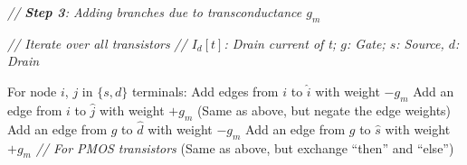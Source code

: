 \begin{algorithm*}[t]
\begin{multicols}{2}
\begin{algorithmic}[1]
    
\EndFor \label{algo1:step2_end}

\Statex\textit{// \textbf{Step 3}: Adding branches due to transconductance $g_m$}

 \textit{// Iterate over all transistors} \label{algo1:step3_begin}
    \Statex \textit{// $I_d[t]$: Drain current of t; $g$: Gate; $s$: Source, $d$: Drain}

            \State For node $i$, $j$  in $\{s,d\}$ terminals:
                \State Add edges from $i$ to $\hat{i}$ with weight $-g_m$ 
                \State Add an edge from $i$ to $\hat{j}$ with weight $+g_m$ 
            \Else  
                \State (Same as above, but negate the edge weights)
            \EndIf
            \State Add an edge from $g$ to $\hat{d}$ with weight $-g_m$ 
            \State Add an edge from $g$ to $\hat{s}$ with weight $+g_m$ 
        \Else \textit{// For PMOS transistors}
            \State (Same as above, but exchange ``then'' and ``else'')
        \EndIf
\EndIf
\EndFor \label{algo1:step3_end}



\end{algorithmic}
\end{multicols}
\end{algorithm*}
